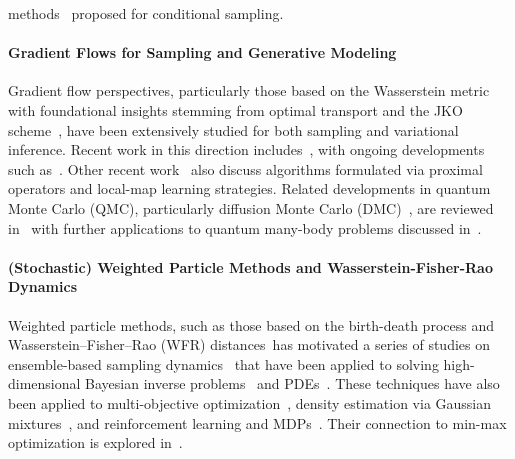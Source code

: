 \documentclass{article}
\numberwithin{equation}{section}
\begin{document}
methods~\cite{dhariwal2021diffusion,wu2024theoretical,chidambaram2024does,ho2022classifier,bansal2023universal,song2023loss,he2023manifold,guo2024gradient,ye2024tfg} proposed for conditional sampling. 



\paragraph{Gradient Flows for Sampling and Generative Modeling}
Gradient flow perspectives, particularly those based on the Wasserstein metric with foundational insights stemming from optimal transport and the JKO scheme~\cite{jordan1998variational}, have been extensively studied for both sampling and variational inference. Recent work in this direction includes~\cite{gao2019deep, ansari2020refining, fan2021variational,lambert2022variational, diao2023forward}, with ongoing developments such as~\cite{wild2023rigorous, shaul2023kinetic, zhang2023mean, cheng2024particle, yao2024minimizing, choi2024scalable, zhu2024neural}. Other recent work~\cite{vidal2023taming, cheng2024convergence, xu2024normalizing, xie2025flow, boffi2024flow, kassraie2024progressive} also discuss algorithms formulated via proximal operators and local-map learning strategies. Related developments in quantum Monte Carlo (QMC), particularly diffusion Monte Carlo (DMC)~\cite{caffarel1988development1, caffarel1988development2}, are reviewed in~\cite{gubernatis2016quantum, becca2017quantum} with further applications to quantum many-body problems discussed in~\cite{lu2020full}. 

\paragraph{(Stochastic) Weighted Particle Methods and Wasserstein-Fisher-Rao Dynamics}

Weighted particle methods, such as those based on the birth-death process and Wasserstein–Fisher–Rao (WFR) distances~\cite{kondratyev2016new,liero2018optimal,chizat2018interpolating}has motivated a series of studies on ensemble-based sampling dynamics~\cite{lindsey2022ensemble, lu2019accelerating, maurais2024sampling, gabrie2022adaptive, tan2023accelerate, chen2024ensemble, pathiraja2024connections} that have been applied to solving  high-dimensional Bayesian inverse problems~\cite{qu2024uncertainty,chen2024efficient} and PDEs~\cite{han2020solving,zhang2024sequential, neklyudov2024wasserstein,chen2024teng}. These techniques have also been applied to multi-objective optimization~\cite{ren2024multi}, density estimation via Gaussian mixtures~\cite{chen2023sampling, yan2024learning}, and reinforcement learning and MDPs~\cite{muller2024fisher}. Their connection to min-max optimization is explored in~\cite{domingo2020mean, ying2022lyapunov, lascu2024fisher}. 
\end{document}
